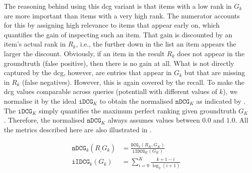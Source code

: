 The reasoning behind using this \acrshort{dcg} variant is that items with a low rank in $G_k$ are more important than items with a very high rank. The numerator accounts for this by assigning high relevance to items that appear early on, which quantifies the gain of inspecting such an item. That gain is discounted by an item's actual rank in $R_k$, i.e., the further down in the list an item appears the larger the discount. Obviously, if an item in the result $R_k$ does not appear in the groundtruth (false positive), then there is no gain at all. What is not directly captured by the \acrshort{dcg}, however, are entries that appear in $G_k$ but that are missing in $R_k$ (false negatives). However, this is again covered by the recall. To make the \acrshort{dcg} values comparable across queries (potentiall with different values of $k$), we normalise it by the ideal $\mathtt{iDCG}_K$ to obtain the normalised $\mathtt{nDCG}_K$ as indicated by . The $\mathtt{iDCG}_K$ simply quantifies the maximum perfect ranking given groundtruth $G_K$. Therefore, the normalised $\mathtt{nDCG}_K$ always assumes values between $0.0$ and $1.0$. All the metrics described here are also illustrated in .

\begin{align}
    \label{equation:ndcg}
    \mathtt{nDCG}_k(R_, G_k) &= \frac{\mathtt{DCG}_k(R_K, G_K)}{\mathtt{iIDCG}_K(G_K)} \\
    \mathtt{iIDCG}_k(G_k) &= \sum_{i = 0}^{K} \frac{k + 1 - i}{\log_2(i + 1)}
\end{align}

